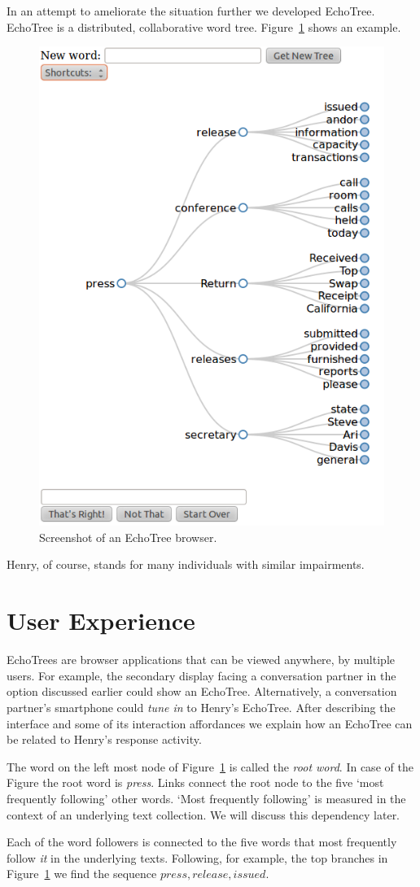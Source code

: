 \documentclass{sigchi}
\begin{document}
In an attempt to ameliorate the situation further we developed
EchoTree. EchoTree is a distributed, collaborative word
tree. Figure~\ref{fig:echoTree} shows an example.
\begin{figure}
   \centering
   \includegraphics[width=0.6\columnwidth]{Figs/echoTreeScreenshot.png}
   \caption{Screenshot of an EchoTree browser.}
   \label{fig:echoTree}
\end{figure}
Henry, of course, stands for many individuals with similar
impairments. 
\section{User Experience}
EchoTrees are browser applications that can be viewed anywhere, by
multiple users. For example, the secondary display facing a
conversation partner in the option discussed earlier could show an
EchoTree. Alternatively, a conversation partner's smartphone could
{\em tune in} to Henry's EchoTree. After describing the interface and
some of its interaction affordances we explain how an EchoTree can be
related to Henry's response activity.

The word on the left most node of Figure~\ref{fig:echoTree} is called
the {\em root word}. In case of the Figure the root word is {\em
  press}. Links connect the root node to the five `most frequently
following' other words.  `Most frequently following' is measured in
the context of an underlying text collection. We will discuss this
dependency later.

Each of the word followers is connected to the five words that most
frequently follow {\em it} in the underlying texts. Following, for
example, the top branches in Figure~\ref{fig:echoTree} we find the
sequence ${press, release, issued}$.
\end{document}
